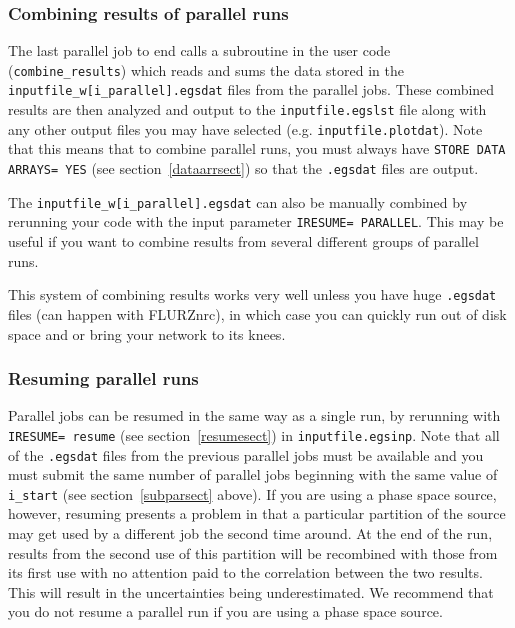 \documentclass[12pt,twoside]{article}  %
\begin{document}
\subsubsection{Combining results of parallel runs}

The last parallel job to end calls a subroutine in the user code
({\tt combine\_results})
which reads and sums the data stored in the
{\tt inputfile\_w[i\_parallel].egsdat} files from the parallel jobs.
These combined results are then analyzed and output
to the {\tt inputfile.egslst} file along with any other output files
you may have selected (e.g. {\tt inputfile.plotdat}).  Note that this
means that to combine parallel runs, you must always have
{\tt STORE DATA ARRAYS= YES} (see section~\ref{dataarrsect}) so that
the {\tt .egsdat} files are output.

The {\tt inputfile\_w[i\_parallel].egsdat} can also be manually combined
by rerunning your code with the input parameter
\verb+IRESUME= PARALLEL+.  This may be useful if you want to combine
results from several different groups of parallel runs.

This system of combining results works very well unless you have
huge {\tt .egsdat}
files (can happen with FLURZnrc), in which case you can quickly run out of
disk space and or bring your network to its knees.

\subsubsection{Resuming parallel runs}

Parallel jobs can be resumed in the same way as a single run, by
rerunning with {\tt IRESUME= resume} (see section~\ref{resumesect})
in {\tt inputfile.egsinp}.
Note that all of the {\tt .egsdat} files from the previous parallel
jobs must be available and you must submit the same number of parallel
jobs beginning with the same value of {\tt i\_start} (see section~\ref{subparsect} above).
If you are using a
phase space source, however, resuming presents a problem in that a
particular partition of the source may get used by a different job the
second time around.  At the end of the run, results from the second
use of this partition will be recombined with those from its first use
with no attention paid to the correlation between the two results.  This
will result in the uncertainties being underestimated.  We recommend that
you do not resume a parallel run if you are using a phase space source.
\end{document}
